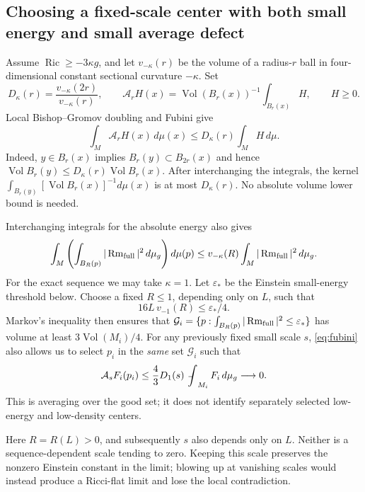 \documentclass[a4paper,11pt]{article}
\numberwithin{equation}{section}
\theoremstyle{definition}
\newcommand{\Ric}{\operatorname{Ric}}
\newcommand{\Rm}{\operatorname{Rm}}
\newcommand{\Vol}{\operatorname{Vol}}
\newcommand{\dd}{\,d\mu_g}
\newcommand{\fint}{\mathop{\rlap{\,\raisebox{0.1ex}{\tiny$-$}}\int}\nolimits}
\begin{document}
\subsection{Choosing a fixed-scale center with both small energy and small average defect}
Assume $\Ric\ge-3\kappa g$, and let $v_{-\kappa}(r)$ be the volume of a radius-$r$ ball in four-dimensional constant sectional curvature $-\kappa$. Set
\[
D_\kappa(r)=\frac{v_{-\kappa}(2r)}{v_{-\kappa}(r)},\qquad
\mathcal A_rH(x)=\Vol(B_r(x))^{-1}\int_{B_r(x)}H,\qquad H\ge0.
\]
Local Bishop--Gromov doubling and Fubini give
\begin{equation}\label{eq:fubini}
 \int_M\mathcal A_rH(x)\,d\mu(x)\le D_\kappa(r)\int_MH\,d\mu.
\end{equation}
Indeed, $y\in B_r(x)$ implies $B_r(y)\subset B_{2r}(x)$ and hence
$\Vol B_r(y)\le D_\kappa(r)\Vol B_r(x)$. After interchanging the integrals, the kernel
$\int_{B_r(y)}[\Vol B_r(x)]^{-1}d\mu(x)$ is at most $D_\kappa(r)$. No absolute volume lower bound is needed.

Interchanging integrals for the absolute energy also gives
\begin{equation}\label{eq:absolute-average}
\int_M\left(\int_{B_R(p)}|\Rm_{\rm full}|^2\dd\right)d\mu(p)
\le v_{-\kappa}(R)\int_M|\Rm_{\rm full}|^2\dd.
\end{equation}
For the exact sequence we may take $\kappa=1$. Let $\varepsilon_*$ be the Einstein small-energy threshold below. Choose a fixed $R\le1$, depending only on $L$, such that
\begin{equation}\label{eq:fixed-radius}
16L\,v_{-1}(R)\le\varepsilon_*/4.
\end{equation}
Markov's inequality then ensures that
$\mathcal G_i=\{p:\int_{B_R(p)}|\Rm_{\rm full}|^2\le\varepsilon_*\}$
has volume at least $3\Vol(M_i)/4$. For any previously fixed small scale $s$, \eqref{eq:fubini} also allows us to select $p_i$ in the \emph{same} set $\mathcal G_i$ such that
\begin{equation}\label{eq:same-center-density}
\mathcal A_sF_i(p_i)\le\frac43D_1(s)\fint_{M_i}F_i\dd
\longrightarrow0.
\end{equation}
This is averaging over the good set; it does not identify separately selected low-energy and low-density centers.

Here $R=R(L)>0$, and subsequently $s$ also depends only on $L$. Neither is a sequence-dependent scale tending to zero. Keeping this scale preserves the nonzero Einstein constant in the limit; blowing up at vanishing scales would instead produce a Ricci-flat limit and lose the local contradiction.
\end{document}
